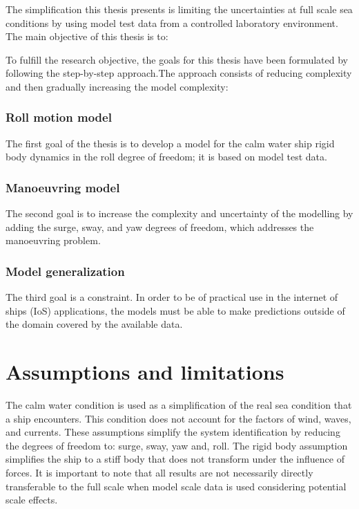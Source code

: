 \noindent The simplification this thesis presents is limiting the uncertainties at full scale sea conditions by using model test data from a controlled laboratory environment. The main objective of this thesis is to:
\begin{quote} 
\expandafter\MakeUppercase \objective
\end{quote}

\noindent 
To fulfill the research objective, the goals for this thesis have been formulated by following the step-by-step approach.The approach consists of reducing complexity and then gradually increasing the model complexity:

\subsubsection*{Roll motion model}
The first goal of the thesis is to develop a model for the calm water ship rigid body dynamics in the roll degree of freedom; it is based on model test data.

\subsubsection*{Manoeuvring model}
The second goal is to increase the complexity and uncertainty of the modelling by adding the surge, sway, and yaw degrees of freedom, which addresses the manoeuvring problem.

\subsubsection*{Model generalization}
The third goal is a constraint. In order to be of practical use in the internet of ships (IoS) applications, the models must be able to make predictions outside of the domain covered by the available data.

\section{Assumptions and limitations}
The calm water condition is used as a simplification of the real sea condition that a ship encounters. This condition does not account for the factors of wind, waves, and currents. These assumptions simplify the system identification by reducing the degrees of freedom to: surge, sway, yaw and, roll. 
The rigid body assumption simplifies the ship to a stiff body that does not transform under the influence of forces. 
It is important to note that all results are not necessarily directly transferable to the full scale when model scale data is used considering potential scale effects. 

